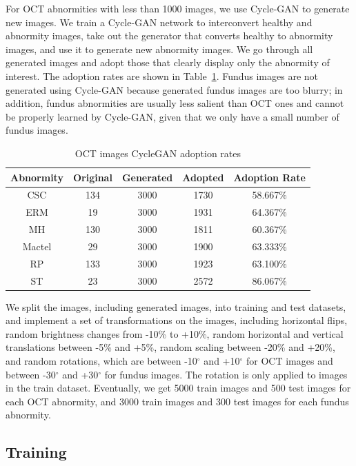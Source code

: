 \documentclass{article}
\begin{document}
	For OCT abnormities with less than 1000 images, we use Cycle-GAN \autocite{Zhu_Park_Isola_Efros_2020} to generate new images. We train a Cycle-GAN network to interconvert healthy and abnormity images, take out the generator that converts healthy to abnormity images, and use it to generate new abnormity images. We go through all generated images and adopt those that clearly display only the abnormity of interest. The adoption rates are shown in Table~\ref{tb:cycleGAN_number}. Fundus images are not generated using Cycle-GAN because generated fundus images are too blurry; in addition, fundus abnormities are usually less salient than OCT ones and cannot be properly learned by Cycle-GAN, given that we only have a small number of fundus images.
	
	{
		\fontsize{9}{12}\selectfont
		{
			\begin{longtable}{ccccc}
				\caption{OCT images CycleGAN adoption rates}
				\label{tb:cycleGAN_number}\\
				\toprule
				Abnormity&Original&Generated&Adopted&Adoption Rate\\
				\midrule
				CSC   &134&3000&1730&58.667\% \\
				ERM   &19 &3000&1931&64.367\% \\
				MH    &130&3000&1811&60.367\% \\
				Mactel&29 &3000&1900&63.333\% \\
				RP    &133&3000&1923&63.100\% \\
				ST    &23 &3000&2572&86.067\% \\
				\bottomrule
			\end{longtable}
		}
	}
	
	We split the images, including generated images, into training and test datasets, and implement a set of transformations on the images, including horizontal flips, random brightness changes from -10\% to +10\%, random horizontal and vertical translations between -5\% and +5\%, random scaling between -20\% and +20\%, and random rotations, which are between -10$^\circ$ and +10$^\circ$ for OCT images and between -30$^\circ$ and +30$^\circ$ for fundus images. The rotation is only applied to images in the train dataset. Eventually, we get 5000 train images and 500 test images for each OCT abnormity, and 3000 train images and 300 test images for each fundus abnormity.
	
	\subsection{Training}
	\label{sec:a_training}
	
\end{document}
